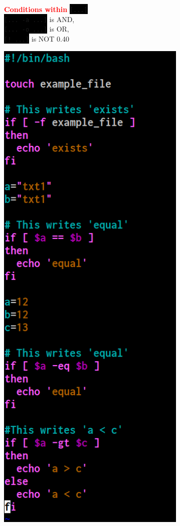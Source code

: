 \documentclass[unknownkeysallowed, 10pt, a4 paper, handout]{beamer}
\newcommand{\focus}[1]{\textbf{\textcolor{red}{#1}}}
\newcommand{\code}[1]{\colorbox{black}{\color{green}\texttt{#1}}}
\begin{document}
\begin{frame}
\begin{center}
{      \focus{Conditions within} \code{[...]}\\
      \code{[... -a ...]} is AND,\\
      \code{[... -o ...]} is OR,\\
      \code{[! ...]} is NOT
    }{\hfill}{0.40}{
      \begin{center}
        \includegraphics[width=0.68\textwidth]{pics/conditional_2.png}
      \end{center}
    }
  \end{center}
\end{frame}
\end{document}
